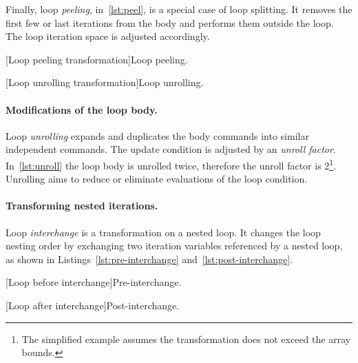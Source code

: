 Finally, loop \emph{peeling}, in~\autoref{lst:peel}, is a special case of loop splitting.
It removes the first few or last iterations from the body and performs them outside the loop.
The loop iteration space is adjusted accordingly.

\begin{center}
\begin{minipage}{\textwidth}
\captionsetup{type=lstlisting}
\begin{minipage}[t]{.45\textwidth}
[Loop peeling transformation]{Loop peeling.}
\label{lst:peel}
\end{minipage}\hfill%
\begin{minipage}[t]{.45\textwidth}
[Loop unrolling transformation]{Loop unrolling.}
\label{lst:unroll}
\end{minipage}
\end{minipage}
\end{center}

\paragraph*{Modifications of the loop body.}
Loop \emph{unrolling} expands and duplicates the body commands into similar independent commands.
The update condition is adjusted by an \emph{unroll factor}.
In~\autoref{lst:unroll} the loop body is unrolled twice, therefore the unroll factor is 2\footnote{
The simplified example assumes the transformation does not exceed the array bounds.}.
Unrolling aims to reduce or eliminate evaluations of the loop condition.

\paragraph*{Transforming nested iterations.}

Loop \emph{interchange} is a transformation on a nested loop.
It changes the loop nesting order by exchanging two iteration variables referenced by a nested loop,
as shown in Listings~\ref{lst:pre-interchange} and~\ref{lst:post-interchange}.

\begin{center}
\begin{minipage}{\textwidth}
\captionsetup{type=lstlisting}
\begin{minipage}[t]{.45\textwidth}
[Loop before interchange]{Pre-interchange.}
\label{lst:pre-interchange}
\end{minipage}\hfill%
\begin{minipage}[t]{.45\textwidth}
[Loop after interchange]{Post-interchange.}
\label{lst:post-interchange}
\end{minipage}
\end{minipage}
\end{center}

